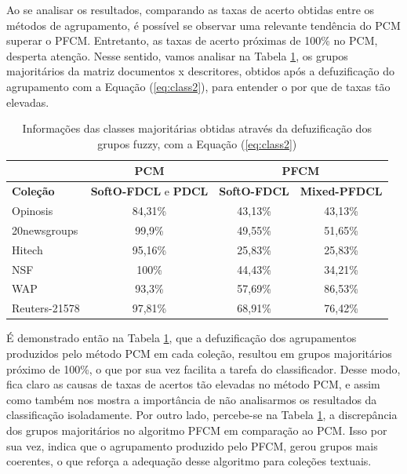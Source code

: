 Ao se analisar os resultados, comparando as taxas de acerto obtidas entre os métodos de agrupamento,
é possível se observar uma relevante tendência do PCM superar o PFCM. Entretanto, as taxas de acerto
próximas de 100\% no PCM, desperta atenção. Nesse sentido, vamos analisar na Tabela
\ref{table:pdclmajority}, os grupos majoritários da matriz documentos x descritores, obtidos após a
defuzificação do agrupamento com a Equação (\ref{eq:class2}), para entender o por que de taxas tão
elevadas. 

\begin{table}[!htp]
  \centering
  \begin{tabular}{|l|c|c c|}
    \hline
    & PCM & \multicolumn{2}{c|}{PFCM} \\
    \hline
    {\bf Coleção} & {\bf SoftO-FDCL} e {\bf PDCL} & {\bf SoftO-FDCL} & {\bf Mixed-PFDCL} \\
    \hline
    Opinosis & 84,31\% & 43,13\% & 43,13\% \\
    \hline
    20newsgroups & 99,9\% & 49,55\% & 51,65\% \\
    \hline
    Hitech & 95,16\% & 25,83\% & 25,83\% \\
    \hline
    NSF & 100\% & 44,43\% &  34,21\% \\
    \hline
    WAP & 93,3\% & 57,69\% & 86,53\% \\
    \hline
    Reuters-21578 & 97,81\% & 68,91\% & 76,42\% \\
    \hline
  \end{tabular}
  \caption{Informações das classes majoritárias obtidas através da defuzificação dos grupos fuzzy,
  com a Equação (\ref{eq:class2})}
  \label{table:pdclmajority}
\end{table}

É demonstrado então na Tabela \ref{table:pdclmajority}, que a defuzificação dos agrupamentos
produzidos pelo método PCM em cada coleção, resultou em grupos majoritários próximo de 100\%, o que
por sua vez facilita a tarefa do classificador. Desse modo, fica claro as causas de taxas de acertos
tão elevadas no método PCM, e assim como também nos mostra a importância de não analisarmos os
resultados da classificação isoladamente. Por outro lado, percebe-se na Tabela
\ref{table:pdclmajority}, a discrepância dos grupos majoritários no algoritmo PFCM em comparação ao
PCM. Isso por sua vez, indica que o agrupamento produzido pelo PFCM, gerou grupos mais coerentes, o
que reforça a adequação desse algoritmo para coleções textuais.

